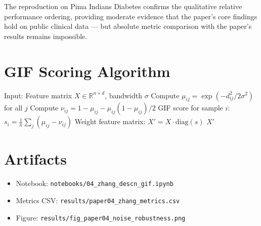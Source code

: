 \documentclass[12pt,a4paper]{article}
\begin{document}
The reproduction on Pima Indians Diabetes confirms the qualitative relative performance ordering, providing moderate evidence that the paper's core findings hold on public clinical data --- but absolute metric comparison with the paper's results remains impossible.

\appendix
\section{GIF Scoring Algorithm}
\begin{algorithm}[H]
\caption{Graph Intuitionistic Fuzzy (GIF) feature weighting}
\begin{algorithmic}[1]
  \State Input: Feature matrix $X \in \mathbb{R}^{n \times d}$, bandwidth $\sigma$
    \State Compute $\mu_{ij} = \exp(-d_{ij}^2 / 2\sigma^2)$ for all $j$
    \State Compute $\nu_{ij} = 1 - \mu_{ij} - \mu_{ij}(1-\mu_{ij})/2$
    \State GIF score for sample $i$: $s_i = \frac{1}{n}\sum_j (\mu_{ij} - \nu_{ij})$
  \EndFor
  \State Weight feature matrix: $X' = X \cdot \text{diag}(s)$
  \State \Return $X'$
\end{algorithmic}
\end{algorithm}

\section{Artifacts}
\begin{itemize}
  \item Notebook: \texttt{notebooks/04\_zhang\_descn\_gif.ipynb}
  \item Metrics CSV: \texttt{results/paper04\_zhang\_metrics.csv}
  \item Figure: \texttt{results/fig\_paper04\_noise\_robustness.png}
\end{itemize}
\end{document}
